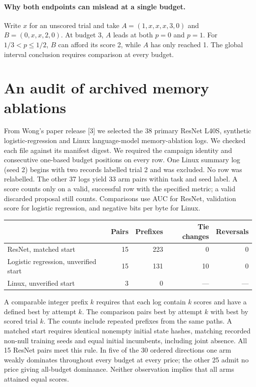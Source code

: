 \documentclass[11pt]{article}
\begin{document}
\paragraph{Why both endpoints can mislead at a single budget.} Write $x$ for an unscored trial and take $A=(1,x,x,x,3,0)$ and $B=(0,x,x,2,0)$. At budget 3, $A$ leads at both $p=0$ and $p=1$. For $1/3<p\le1/2$, $B$ can afford its score 2, while $A$ has only reached 1. The global interval conclusion requires comparison at every budget.
\newpage
\section{An audit of archived memory ablations}
From Wong's paper release [3] we selected the 38 primary ResNet L40S, synthetic logistic-regression and Linux language-model memory-ablation logs. We checked each file against its manifest digest. We required the campaign identity and consecutive one-based budget positions on every row. One Linux summary log (seed 2) begins with two records labelled trial 2 and was excluded. No row was relabelled. The other 37 logs yield 33 arm pairs within task and seed label. A score counts only on a valid, successful row with the specified metric; a valid discarded proposal still counts. Comparisons use AUC for ResNet, validation score for logistic regression, and negative bits per byte for Linux.

\begin{center}
\begin{tabular}{lrrrr}
\toprule
& Pairs & Prefixes & Tie changes & Reversals\\
\midrule
ResNet, matched start & 15 & 223 & 0 & 0\\
Logistic regression, unverified start & 15 & 131 & 10 & 0\\
Linux, unverified start & 3 & 0 & --- & ---\\
\bottomrule
\end{tabular}
\end{center}
A comparable integer prefix $k$ requires that each log contain $k$ scores and have a defined best by attempt $k$. The comparison pairs best by attempt $k$ with best by scored trial $k$. The counts include repeated prefixes from the same paths. A matched start requires identical nonempty initial state hashes, matching recorded non-null training seeds and equal initial incumbents, including joint absence. All 15 ResNet pairs meet this rule. In five of the 30 ordered directions one arm weakly dominates throughout every budget at every price; the other 25 admit no price giving all-budget dominance. Neither observation implies that all arms attained equal scores.
\end{document}
